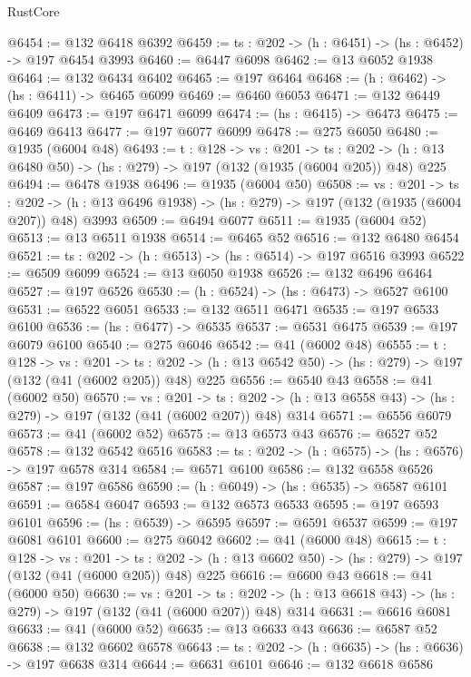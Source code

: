 \begin{lexlean}{RustCore}
\begin{coremodule}
@6454 := @132 @6418 @6392
@6459 := {ts : @202} -> (h : @6451) -> (hs : @6452) -> @197 @6454 @3993
@6460 := @6447 @6098
@6462 := @13 @6052 @1938
@6464 := @132 @6434 @6402
@6465 := @197 @6464
@6468 := (h : @6462) -> (hs : @6411) -> @6465 @6099
@6469 := @6460 @6053
@6471 := @132 @6449 @6409
@6473 := @197 @6471 @6099
@6474 := (hs : @6415) -> @6473
@6475 := @6469 @6413
@6477 := @197 @6077 @6099
@6478 := @275 @6050
@6480 := @1935 (@6004 @48)
@6493 := {t : @128} ->
  {vs : @201} ->
  {ts : @202} -> (h : @13 @6480 @50) -> (hs : @279) -> @197 (@132 (@1935 (@6004 @205)) @48) @225
@6494 := @6478 @1938
@6496 := @1935 (@6004 @50)
@6508 := {vs : @201} ->
  {ts : @202} -> (h : @13 @6496 @1938) -> (hs : @279) -> @197 (@132 (@1935 (@6004 @207)) @48) @3993
@6509 := @6494 @6077
@6511 := @1935 (@6004 @52)
@6513 := @13 @6511 @1938
@6514 := @6465 @52
@6516 := @132 @6480 @6454
@6521 := {ts : @202} -> (h : @6513) -> (hs : @6514) -> @197 @6516 @3993
@6522 := @6509 @6099
@6524 := @13 @6050 @1938
@6526 := @132 @6496 @6464
@6527 := @197 @6526
@6530 := (h : @6524) -> (hs : @6473) -> @6527 @6100
@6531 := @6522 @6051
@6533 := @132 @6511 @6471
@6535 := @197 @6533 @6100
@6536 := (hs : @6477) -> @6535
@6537 := @6531 @6475
@6539 := @197 @6079 @6100
@6540 := @275 @6046
@6542 := @41 (@6002 @48)
@6555 := {t : @128} ->
  {vs : @201} ->
  {ts : @202} -> (h : @13 @6542 @50) -> (hs : @279) -> @197 (@132 (@41 (@6002 @205)) @48) @225
@6556 := @6540 @43
@6558 := @41 (@6002 @50)
@6570 := {vs : @201} ->
  {ts : @202} -> (h : @13 @6558 @43) -> (hs : @279) -> @197 (@132 (@41 (@6002 @207)) @48) @314
@6571 := @6556 @6079
@6573 := @41 (@6002 @52)
@6575 := @13 @6573 @43
@6576 := @6527 @52
@6578 := @132 @6542 @6516
@6583 := {ts : @202} -> (h : @6575) -> (hs : @6576) -> @197 @6578 @314
@6584 := @6571 @6100
@6586 := @132 @6558 @6526
@6587 := @197 @6586
@6590 := (h : @6049) -> (hs : @6535) -> @6587 @6101
@6591 := @6584 @6047
@6593 := @132 @6573 @6533
@6595 := @197 @6593 @6101
@6596 := (hs : @6539) -> @6595
@6597 := @6591 @6537
@6599 := @197 @6081 @6101
@6600 := @275 @6042
@6602 := @41 (@6000 @48)
@6615 := {t : @128} ->
  {vs : @201} ->
  {ts : @202} -> (h : @13 @6602 @50) -> (hs : @279) -> @197 (@132 (@41 (@6000 @205)) @48) @225
@6616 := @6600 @43
@6618 := @41 (@6000 @50)
@6630 := {vs : @201} ->
  {ts : @202} -> (h : @13 @6618 @43) -> (hs : @279) -> @197 (@132 (@41 (@6000 @207)) @48) @314
@6631 := @6616 @6081
@6633 := @41 (@6000 @52)
@6635 := @13 @6633 @43
@6636 := @6587 @52
@6638 := @132 @6602 @6578
@6643 := {ts : @202} -> (h : @6635) -> (hs : @6636) -> @197 @6638 @314
@6644 := @6631 @6101
@6646 := @132 @6618 @6586

\end{coremodule}
\end{lexlean}
